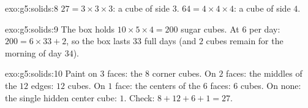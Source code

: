 \begin{solution}{exo:g5:solids:8}
$27 = 3 \times 3 \times 3$: a cube of side $3$.
$64 = 4 \times 4 \times 4$: a cube of side $4$.
\end{solution}

\begin{solution}{exo:g5:solids:9}
The box holds $10 \times 5 \times 4 = 200$ sugar cubes. At $6$ per
day: $200 = 6 \times 33 + 2$, so the box lasts $33$ full days (and
$2$ cubes remain for the morning of day $34$).
\end{solution}

\begin{solution}{exo:g5:solids:10}
Paint on $3$ faces: the $8$ corner cubes. On $2$ faces: the middles
of the $12$ edges: $12$ cubes. On $1$ face: the centers of the $6$
faces: $6$ cubes. On none: the single hidden center cube: $1$.
Check: $8 + 12 + 6 + 1 = 27$. \checkmark
\end{solution}
